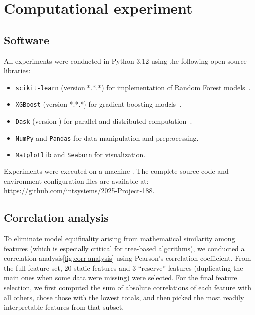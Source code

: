 \section{Computational experiment}
\label{sec:computational-experiment}

\subsection*{Software}
All experiments were conducted in Python 3.12 using the following open-source libraries:
\begin{itemize}
    \item \texttt{scikit-learn} (version *.*.*) for implementation of Random Forest models~\cite{pedregosaScikitlearnMachineLearning}.
    \item \texttt{XGBoost} (version *.*.*) for gradient boosting models~\cite{chenXGBoostScalableTree2016a}.
    \item \texttt{Dask} (version ) for parallel and distributed computation~\cite{rocklinDaskParallelComputation2015}.
    \item \texttt{NumPy} and \texttt{Pandas} for data manipulation and preprocessing.
    \item \texttt{Matplotlib} and \texttt{Seaborn} for visualization.
\end{itemize}
Experiments were executed on a machine . The complete source code and environment configuration files are available at: \url{https://github.com/intsystems/2025-Project-188}.

\subsection{Correlation analysis}

To eliminate model equifinality arising from mathematical similarity among features (which is especially critical for tree-based algorithms), we conducted a correlation analysis\ref{fig:corr-analysis} using Pearson’s correlation coefficient. From the full feature set, 20 static features and 3 ``reserve'' features (duplicating the main ones when some data were missing) were selected. For the final feature selection, we first computed the sum of absolute correlations of each feature with all others, chose those with the lowest totals, and then picked the most readily interpretable features from that subset.

